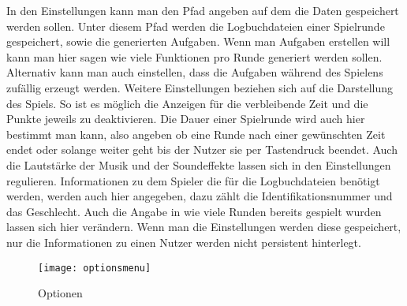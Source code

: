 In den Einstellungen kann man den Pfad angeben auf dem die Daten gespeichert werden sollen. Unter diesem Pfad werden die Logbuchdateien einer Spielrunde gespeichert, sowie die generierten Aufgaben. Wenn man Aufgaben erstellen will kann man hier sagen wie viele Funktionen pro Runde generiert werden sollen. Alternativ kann man auch einstellen, dass die Aufgaben während des Spielens zufällig erzeugt werden. Weitere Einstellungen beziehen sich auf die Darstellung des Spiels. So ist es möglich die Anzeigen für die verbleibende Zeit und die Punkte jeweils zu deaktivieren. Die Dauer einer Spielrunde wird auch hier bestimmt man kann, also angeben ob eine Runde nach einer gewünschten Zeit endet oder solange weiter geht bis der Nutzer sie per Tastendruck beendet. Auch die Lautstärke der Musik und der Soundeffekte lassen sich in den Einstellungen regulieren. Informationen zu dem Spieler die für die Logbuchdateien benötigt werden, werden auch hier angegeben, dazu zählt die Identifikationsnummer und das Geschlecht. Auch die Angabe in wie viele Runden bereits gespielt wurden lassen sich hier verändern. Wenn man die Einstellungen werden diese gespeichert, nur die Informationen zu einen Nutzer werden nicht persistent hinterlegt.

\begin{wrapfigure}{r}{0.3\textwidth}
	\centering
    \texttt{[image: optionsmenu]}
    \caption{Optionen}
    \label{option}
\end{wrapfigure}

